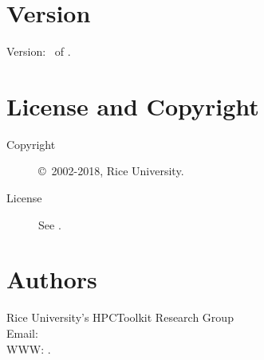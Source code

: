 \documentclass[english]{article}
\begin{document}
\section{Version}

Version: \Version\ of \Date.

\section{License and Copyright}

\begin{description}
\item[Copyright] \copyright\ 2002-2018, Rice University.
\item[License] See .
\end{description}

\section{Authors}

\noindent
Rice University's HPCToolkit Research Group \\
Email:  \\
WWW: .

\LatexManEnd
\end{document}
